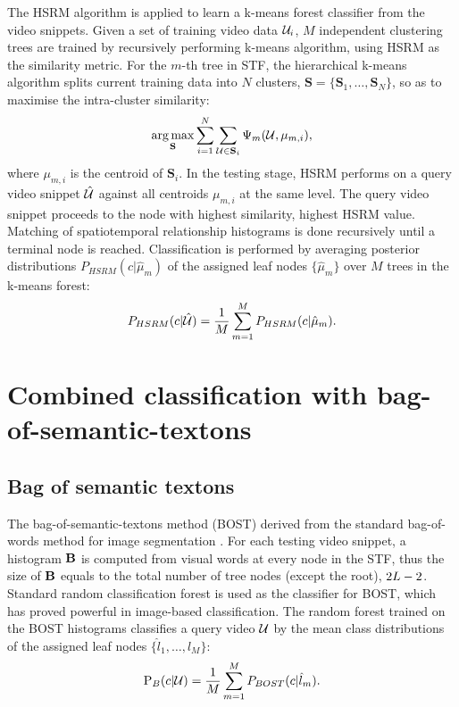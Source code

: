 The HSRM algorithm is applied to learn a k-means forest classifier from the video snippets. Given a set of training video data $\mathcal{U}_i$, $M$ independent clustering trees are trained by recursively performing k-means algorithm, using HSRM as the similarity metric. 
For the $m$-th tree in STF, the hierarchical k-means algorithm splits current training data into $N$ clusters, $\mathbf{S} = \{\mathbf{S}_1,\dots,\mathbf{S}_N\}$, so as to maximise the intra-cluster similarity:
\begin{equation}
	\displaystyle\operatorname*{arg\,max}_{\mathbf{S}} \displaystyle\sum_{i = 1}^{N}\sum_{\mathcal{U} \in \mathbf{S}_{i}} \Psi_m(\mathcal{U}, \mu_{m,i}),
	\label{eqn/act/kmeans}
\end{equation}
where $\mu_{m,i}$ is the centroid of $\mathbf{S}_i$. In the testing stage, HSRM performs on a query video snippet $\mathcal{\hat{U}}$ against all centroids $\mu_{m,i}$ at the same level. The query video snippet proceeds to the node with highest similarity, \ie highest HSRM value. Matching of spatiotemporal relationship histograms is done recursively until a terminal node is reached. Classification is performed by averaging posterior distributions $P_{HSRM}(c|\hat{\mu}_{m})$ of the assigned leaf nodes $\{ \hat{\mu}_m \}$ over $M$ trees in the k-means forest: 
\begin{equation}
	P_{HSRM}(c|\mathcal{\hat{U}}) = 
	\frac{1}{M}\displaystyle\sum_{m=1}^{M}P_{HSRM}(c|\hat{\mu}_{m}).
	\label{eqn/act/kmeansforest}
\end{equation}

\section{Combined classification with bag-of-semantic-textons}
\label{sec/act/combine}

\subsection{Bag of semantic textons}
The bag-of-semantic-textons method (BOST) derived from the standard bag-of-words method for image segmentation \cite{Shotton2008}. For each testing video snippet, a histogram $\mathbf{B}$ is computed from visual words at every node in the STF, thus the size of $\mathbf{B}$ equals to the total number of tree nodes (except the root), \ie $2L - 2$.  
Standard random classification forest \cite{Breiman2001} is used as the classifier for BOST, which has proved powerful in image-based classification. 
The random forest trained on the BOST histograms classifies a query video $\mathcal{U}$ by the mean class distributions of the assigned leaf nodes $\{\hat{l}_1,\dots,\hat{l}_{M}\}$:
\begin{equation}
\mathrm{P}_{B}(c|\mathcal{U}) = \frac{1}{M}\displaystyle\sum_{m=1}^{M}P_{BOST}(c|\hat{l}_m).
\label{eqn/act/bost}
\end{equation}

